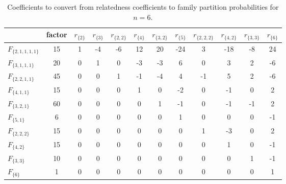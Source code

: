 \begin{table}[h]
\centering
\caption{Coefficients to convert from relatedness coefficients to family partition probabilities for $n=6$.}
\label{rho2psi6}
\begin{tabular}{lccccccccccc}
\toprule
                    &  factor &  $r_{\{2\}}$ &  $r_{\{3\}}$ &  $r_{\{2,2\}}$ &  $r_{\{4\}}$ &  $r_{\{3,2\}}$ &  $r_{\{5\}}$ &  $r_{\{2,2,2\}}$ &  $r_{\{4,2\}}$ &  $r_{\{3,3\}}$ &  $r_{\{6\}}$ \\
\midrule
$F_{\{2,1,1,1,1\}}$ &      15 &            1 &           -4 &             -6 &           12 &             20 &          -24 &                3 &            -18 &             -8 &           24 \\
  $F_{\{3,1,1,1\}}$ &      20 &            0 &            1 &              0 &           -3 &             -3 &            6 &                0 &              3 &              2 &           -6 \\
  $F_{\{2,2,1,1\}}$ &      45 &            0 &            0 &              1 &           -1 &             -4 &            4 &               -1 &              5 &              2 &           -6 \\
    $F_{\{4,1,1\}}$ &      15 &            0 &            0 &              0 &            1 &              0 &           -2 &                0 &             -1 &              0 &            2 \\
    $F_{\{3,2,1\}}$ &      60 &            0 &            0 &              0 &            0 &              1 &           -1 &                0 &             -1 &             -1 &            2 \\
      $F_{\{5,1\}}$ &       6 &            0 &            0 &              0 &            0 &              0 &            1 &                0 &              0 &              0 &           -1 \\
    $F_{\{2,2,2\}}$ &      15 &            0 &            0 &              0 &            0 &              0 &            0 &                1 &             -3 &              0 &            2 \\
      $F_{\{4,2\}}$ &      15 &            0 &            0 &              0 &            0 &              0 &            0 &                0 &              1 &              0 &           -1 \\
      $F_{\{3,3\}}$ &      10 &            0 &            0 &              0 &            0 &              0 &            0 &                0 &              0 &              1 &           -1 \\
        $F_{\{6\}}$ &       1 &            0 &            0 &              0 &            0 &              0 &            0 &                0 &              0 &              0 &            1 \\
\bottomrule
\end{tabular}
\end{table}

